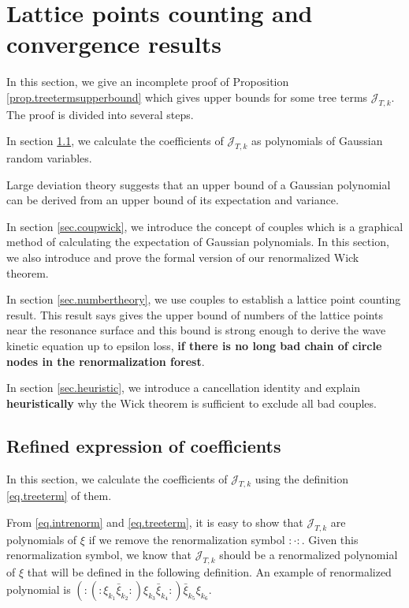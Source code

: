 \section{Lattice points counting and convergence results}
In this section, we give an incomplete proof of Proposition \ref{prop.treetermsupperbound} which gives upper bounds for some tree terms $\mathcal{J}_{T,k}$. The proof is divided into several steps.

In section \ref{sec.refexp}, we calculate the coefficients of $\mathcal{J}_{T,k}$ as polynomials of Gaussian random variables.

Large deviation theory suggests that an upper bound of a Gaussian polynomial can be derived from an upper bound of its expectation and variance.

In section \ref{sec.coupwick}, we introduce the concept of couples which is a graphical method of calculating the expectation of Gaussian polynomials. In this section, we also introduce and prove the formal version of our renormalized Wick theorem.

In section \ref{sec.numbertheory}, we use couples to establish a lattice point counting result. This result says gives the upper bound of numbers of the lattice points near the resonance surface and this bound is strong enough to derive the wave kinetic equation up to epsilon loss, \textbf{if there is no long bad chain of circle nodes in the renormalization forest}.

In section \ref{sec.heuristic}, we introduce a cancellation identity and explain \textbf{heuristically} why the Wick theorem is sufficient to exclude all bad couples.






\subsection{Refined expression of coefficients}\label{sec.refexp} In this section, we calculate the coefficients of $\mathcal{J}_{T,k}$ using the definition \eqref{eq.treeterm} of them.



From \eqref{eq.intrenorm} and \eqref{eq.treeterm}, it is easy to show that $\mathcal{J}_{T,k}$ are polynomials of $\xi$ if we remove the renormalization symbol $:\cdot:$. Given this renormalization symbol, we know that $\mathcal{J}_{T,k}$ should be a renormalized polynomial of $\xi$ that will be defined in the following definition. An example of renormalized polynomial is $(:(:\xi_{k_1}\bar{\xi}_{k_2}:)\xi_{k_3}\bar{\xi}_{k_4}:)\bar{\xi}_{k_5}\xi_{k_6}$.

